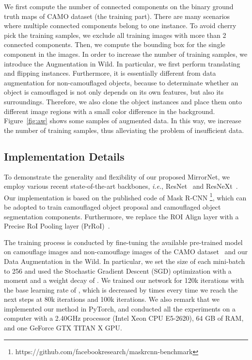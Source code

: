 \documentclass[journal]{IEEEtran}
\begin{document}
We first compute the number of connected components on the binary ground truth maps of CAMO dataset (the training part). There are many scenarios where multiple connected components belong to one instance. To avoid cherry pick the training samples, we exclude all training images with more than 2 connected components. Then, we compute the bounding box for the single component in the images. In order to increase the number of training samples, we introduce the Augmentation in Wild. In particular, we first perform translating and flipping instances. Furthermore, it is essentially different from data augmentation for non-camouflaged objects, because to determinate whether an object is camouflaged is not only depends on its own features, but also its surroundings. Therefore, we also clone the object instances and place them onto different image regions with a small color difference in the background. Figure~\ref{fig:aw} shows some samples of augmented data. In this way, we increase the number of training samples, thus alleviating the problem of insufficient data.

\subsection{Implementation Details}
To demonstrate the generality and flexibility of our proposed MirrorNet, we employ various recent state-of-the-art backbones, \textit{i.e.},  ResNet~\cite{He-CVPR2016} and ResNeXt~\cite{resnext}. Our implementation is based on the published code of Mask R-CNN \footnote{https://github.com/facebookresearch/maskrcnn-benchmark}, which can be adopted to train camouflaged object proposal and camouflaged object segmentation components. Furthermore, we replace the ROI Align layer with a Precise RoI Pooling layer (PrRoI)~\cite{PrROI}. 

The training process is conducted by fine-tuning the available pre-trained model on camouflage images and non-camouflage images of the CAMO dataset~\cite{CAMO} and our Data Augmentation in the Wild. In particular, we set the size of each mini-batch to 256 and used the Stochastic Gradient Descent (SGD) optimization with a moment  and a weight decay of . We trained our network for 120k iterations with the base learning rate of , which is decreased by  times every time we reach the next steps at 80k iterations and 100k iterations. We also remark that we implemented our method in PyTorch, and conducted all the experiments on a computer with a 2.40GHz processor (Intel Xeon CPU E5-2620), 64 GB of RAM, and one GeForce GTX TITAN X GPU. 
\end{document}

